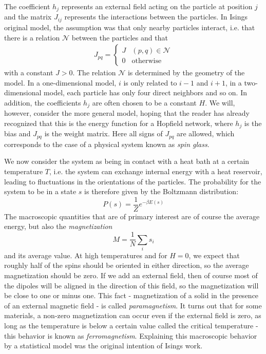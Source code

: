 \documentclass[a4paper, draft]{article}
\theoremstyle{own}
\theoremstyle{remark}
\begin{document}
The coefficient $h_j$ represents an external field acting on the particle at position $j$ and the matrix $J_{ij}$ represents the interactions between the particles. In Isings original model, the assumption was that only nearby particles interact, i.e. that there is a relation ${\mathcal N}$ between the particles and that
\begin{align}\label{eq:isingmodellsimple}
J_{pq} = 
\begin{cases}
J & (p,q) \in {\mathcal N} \\
0 & \text{otherwise}
\end{cases}
\end{align}
with a constant $J > 0$. 
The relation $\mathcal N$ is determined by the geometry of the model. In a one-dimensional model, $i$ is only related to $i-1$ and $i+1$, in a two-dimensional model, each particle has only four direct neighbors and so on. In addition, the coefficients $h_j$ are often chosen to be a constant $H$. We will, however, consider the more general model, hoping that the reader has already recognized that this is the energy function for a Hopfield network, where $h_j$ is the bias and $J_{pq}$ is the weight matrix. Here all signs of $J_{pq}$ are allowed, which corresponds to the case of a physical system known as {\em spin glass}. 

We now consider the system as being in contact with a heat bath at a certain temperature $T$, i.e. the system can exchange internal energy with a heat reservoir, leading to fluctuations in the orientations of the particles. The probability for the system to be in a state $s$ is therefore given by the Boltzmann distribution:
$$
P(s) = \frac{1}{Z} e^{-\beta E(s)}
$$
The macroscopic quantities that are of primary interest are of course the average energy, but also the {\em magnetization}
$$
M = \frac{1}{N} \sum_i s_i
$$
and its average value. At high temperatures and for $H = 0$, we expect that roughly half of the spins should be oriented in either direction, so the average magnetization should be zero. If we add an external field, then of course most of the dipoles will be aligned in the direction of this field, so the magnetization will be close to one or minus one. This fact - magnetization of a solid in the presence of an external magnetic field - is called {\em paramagnetism}. It turns out that for some materials, a non-zero magnetization can occur even if the external field is zero, as long as the temperature is below a certain value called the critical temperature - this behavior is known as {\em ferromagnetism}. Explaining this macroscopic behavior by a statistical model was the original intention of Isings work. 
\end{document}
